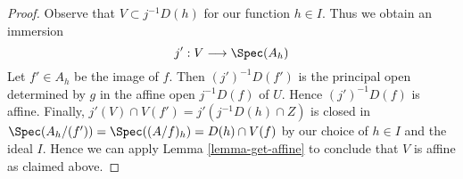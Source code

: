 \begin{proof}
\medskip\noindent
Observe that $V \subset j^{-1}D(h)$ for our function $h \in I$.
Thus we obtain an immersion
$$
j' : V \longrightarrow \Spec(A_h)
$$
Let $f' \in A_h$ be the image of $f$. Then $(j')^{-1}D(f')$
is the principal open determined by $g$ in the affine
open $j^{-1}D(f)$ of $U$.
Hence $(j')^{-1}D(f)$ is affine. Finally,
$j'(V) \cap V(f') = j'(j^{-1}D(h) \cap Z)$
is closed in $\Spec(A_h/(f')) = \Spec((A/f)_h) = D(h) \cap V(f)$
by our choice of $h \in I$ and the ideal $I$. Hence we can apply
Lemma \ref{lemma-get-affine}
to conclude that $V$ is affine as claimed above.
\end{proof}


















